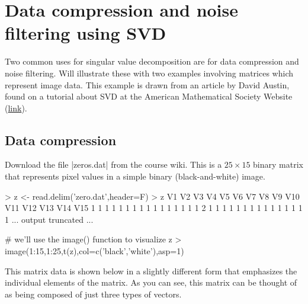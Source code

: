 

\section{Data compression and noise filtering using SVD}

Two common uses for singular value decomposition are for data compression and noise filtering. Will illustrate these with two examples involving matrices which represent image data. This example is drawn from an article by David Austin, found on a tutorial about SVD at the American Mathematical Society Website (\href{http://www.ams.org/samplings/feature-column/fcarc-svd}{link}).

\subsection{Data compression}

Download the file |zeros.dat| from the course wiki. This is a $25 \times 15$ binary matrix that represents pixel values in a simple binary (black-and-white) image.

\begin{R}
> z <- read.delim('zero.dat',header=F)
> z
   V1 V2 V3 V4 V5 V6 V7 V8 V9 V10 V11 V12 V13 V14 V15
1   1  1  1  1  1  1  1  1  1   1   1   1   1   1   1
2   1  1  1  1  1  1  1  1  1   1   1   1   1   1   1
... output truncated ...

# we'll use the image() function to visualize z
> image(1:15,1:25,t(z),col=c('black','white'),asp=1)
\end{R}

This matrix data is shown below in a slightly different form that emphasizes the individual elements of the matrix.  As you can see, this matrix can be thought of as being composed of just three types of vectors.


